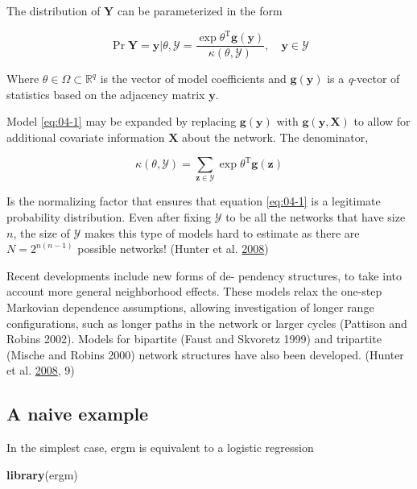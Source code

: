 \documentclass[]{book}
\newenvironment{Shaded}{\begin{snugshade}}{\end{snugshade}}
\newcommand{\KeywordTok}[1]{\textcolor[rgb]{0.13,0.29,0.53}{\textbf{#1}}}
\newcommand{\NormalTok}[1]{#1}
\theoremstyle{definition}
\theoremstyle{definition}
\theoremstyle{definition}
\theoremstyle{remark}
\begin{document}
The distribution of \(\mathbf{Y}\) can be parameterized in the form

\[
\Pr{\mathbf{Y}=\mathbf{y}|\theta, \mathcal{Y}} = \frac{\exp{\theta^{\mbox{T}}\mathbf{g}(\mathbf{y})}}{\kappa\left(\theta, \mathcal{Y}\right)},\quad\mathbf{y}\in\mathcal{Y}
\label{eq:04-1}
\]

Where \(\theta\in\Omega\subset\mathbb{R}^q\) is the vector of model
coefficients and \(\mathbf{g}(\mathbf{y})\) is a \emph{q}-vector of
statistics based on the adjacency matrix \(\mathbf{y}\).

Model \eqref{eq:04-1} may be expanded by replacing
\(\mathbf{g}(\mathbf{y})\) with \(\mathbf{g}(\mathbf{y}, \mathbf{X})\)
to allow for additional covariate information \(\mathbf{X}\) about the
network. The denominator,

\[
\kappa\left(\theta,\mathcal{Y}\right) = \sum_{\mathbf{z}\in\mathcal{Y}}\exp{\theta^{\mbox{T}}\mathbf{g}(\mathbf{z})}
\]

Is the normalizing factor that ensures that equation \eqref{eq:04-1} is a
legitimate probability distribution. Even after fixing \(\mathcal{Y}\)
to be all the networks that have size \(n\), the size of \(\mathcal{Y}\)
makes this type of models hard to estimate as there are
\(N = 2^{n(n-1)}\) possible networks! (Hunter et al.
\protect\hyperlink{ref-Hunter2008}{2008})

Recent developments include new forms of de- pendency structures, to
take into account more general neighborhood effects. These models relax
the one-step Markovian dependence assumptions, allowing investigation of
longer range configurations, such as longer paths in the network or
larger cycles (Pattison and Robins 2002). Models for bipartite (Faust
and Skvoretz 1999) and tripartite (Mische and Robins 2000) network
structures have also been developed. (Hunter et al.
\protect\hyperlink{ref-Hunter2008}{2008}, 9)

\subsection{A naive example}\label{a-naive-example}

In the simplest case, ergm is equivalent to a logistic regression

\begin{Shaded}
\begin{Highlighting}[]
\KeywordTok{library}\NormalTok{(ergm)}
\end{Highlighting}
\end{Shaded}
\end{document}
